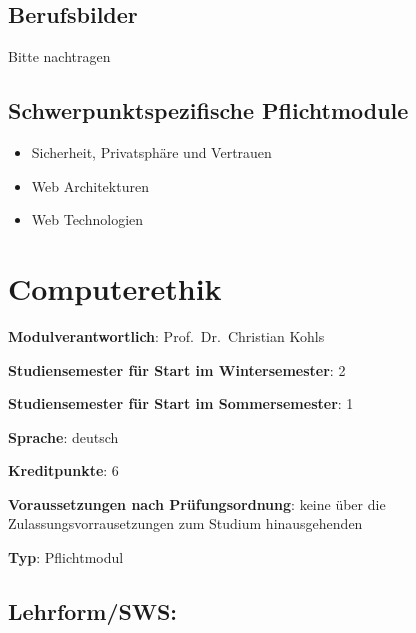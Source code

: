 \section*{Berufsbilder}\label{berufsbilder-4}

Bitte nachtragen

\section*{Schwerpunktspezifische
Pflichtmodule}\label{schwerpunktspezifische-pflichtmodule-4}

\begin{itemize}
\tightlist
\item
  Sicherheit, Privatsphäre und Vertrauen
\item
  Web Architekturen
\item
  Web Technologien
\end{itemize}

\chapter{Computerethik}\label{computerethik}

\begin{modulHead}
\textbf{Modulverantwortlich}: Prof.~Dr.~Christian
Kohls
\end{modulHead}
\begin{modulHead}
\textbf{Studiensemester für
Start im Wintersemester}:
2
\end{modulHead}
\begin{modulHead}
\textbf{Studiensemester für Start
im Sommersemester}:
1
\end{modulHead}
\begin{modulHead}
\textbf{Sprache}:
deutsch
\end{modulHead}
\begin{modulHead}
\textbf{Kreditpunkte}:
6
\end{modulHead}
\begin{modulHead}
\textbf{Voraussetzungen nach
Prüfungsordnung}: keine über die Zulassungsvorrausetzungen zum Studium
hinausgehenden
\end{modulHead}
\begin{modulHead}
\textbf{Typ}:
Pflichtmodul
\end{modulHead}


\section*{Lehrform/SWS:}\label{lehrformsws}

